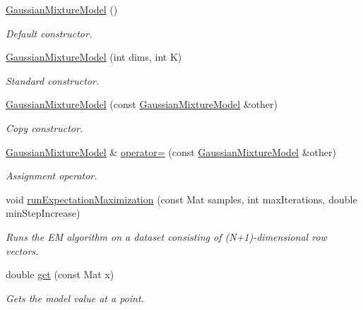 \begin{DoxyCompactItemize}
\item 
\hyperlink{classGaussianMixtureModel_a8b82fa82e365b6738d7ab0a4db83c5eb}{\-Gaussian\-Mixture\-Model} ()
\begin{DoxyCompactList}\small\item\em \-Default constructor. \end{DoxyCompactList}\item 
\hyperlink{classGaussianMixtureModel_a45513392d67091e55d263a24a83d13b9}{\-Gaussian\-Mixture\-Model} (int dims, int \-K)
\begin{DoxyCompactList}\small\item\em \-Standard constructor. \end{DoxyCompactList}\item 
\hyperlink{classGaussianMixtureModel_a61c576d83e4b671768610bfd8694bb35}{\-Gaussian\-Mixture\-Model} (const \hyperlink{classGaussianMixtureModel}{\-Gaussian\-Mixture\-Model} \&other)
\begin{DoxyCompactList}\small\item\em \-Copy constructor. \end{DoxyCompactList}\item 
\hyperlink{classGaussianMixtureModel}{\-Gaussian\-Mixture\-Model} \& \hyperlink{classGaussianMixtureModel_abdfd7139a813b0cabd7d072c7c99269b}{operator=} (const \hyperlink{classGaussianMixtureModel}{\-Gaussian\-Mixture\-Model} \&other)
\begin{DoxyCompactList}\small\item\em \-Assignment operator. \end{DoxyCompactList}\item 
void \hyperlink{classGaussianMixtureModel_a50c3b8e8dcf817607ffa6b9e7ca28a1d}{run\-Expectation\-Maximization} (const \-Mat samples, int max\-Iterations, double min\-Step\-Increase)
\begin{DoxyCompactList}\small\item\em \-Runs the \-E\-M algorithm on a dataset consisting of (\-N+1)-\/dimensional row vectors. \end{DoxyCompactList}\item 
double \hyperlink{classGaussianMixtureModel_a85bd90a3f233462b27970c296206edfa}{get} (const \-Mat x)
\begin{DoxyCompactList}\small\item\em \-Gets the model value at a point. \end{DoxyCompactList}\item 

\end{DoxyCompactItemize}
